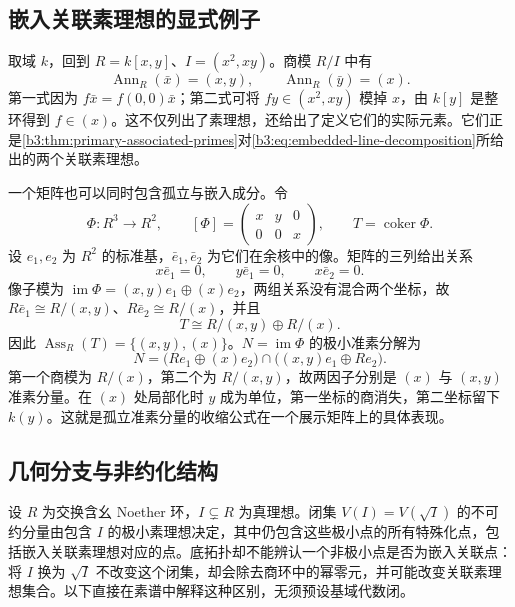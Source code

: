 \subsection{嵌入关联素理想的显式例子}
\label{b3:subsec:0404:02}

取域 \(k\)，回到 \(R=k[x,y]\)、\(I=(x^2,xy)\)。商模 \(R/I\) 中有
\[
	\operatorname{Ann}_R(\bar x)=(x,y),\qquad \operatorname{Ann}_R(\bar y)=(x).
\]
第一式因为 \(f\bar x=f(0,0)\bar x\)；第二式可将 \(fy\in(x^2,xy)\) 模掉 \(x\)，由 \(k[y]\) 是整环得到 \(f\in(x)\)。这不仅列出了素理想，还给出了定义它们的实际元素。它们正是\cref{b3:thm:primary-associated-primes}对\cref{b3:eq:embedded-line-decomposition}所给出的两个关联素理想。

\ProseParagraphBreak
一个矩阵也可以同时包含孤立与嵌入成分。令
\[
	\Phi:R^3\longrightarrow R^2,\qquad
	[\Phi]=\begin{pmatrix}x&y&0\\0&0&x\end{pmatrix},
	\qquad T=\operatorname{coker}\Phi.
\]
设 \(e_1,e_2\) 为 \(R^2\) 的标准基，\(\bar e_1,\bar e_2\) 为它们在余核中的像。矩阵的三列给出关系
\[
	x\bar e_1=0,\qquad y\bar e_1=0,\qquad x\bar e_2=0.
\]
像子模为 \(\operatorname{im}\Phi=(x,y)e_1\oplus(x)e_2\)，两组关系没有混合两个坐标，故 \(R\bar e_1\cong R/(x,y)\)、\(R\bar e_2\cong R/(x)\)，并且
\[
	T\cong R/(x,y)\oplus R/(x).
\]
因此 \(\operatorname{Ass}_R(T)=\bigl\{(x,y),(x)\bigr\}\)。\(N=\operatorname{im}\Phi\) 的极小准素分解为
\[
	N=\bigl(Re_1\oplus(x)e_2\bigr) \cap\bigl((x,y)e_1\oplus Re_2\bigr).
\]
第一个商模为 \(R/(x)\)，第二个为 \(R/(x,y)\)，故两因子分别是 \((x)\) 与 \((x,y)\) 准素分量。在 \((x)\) 处局部化时 \(y\) 成为单位，第一坐标的商消失，第二坐标留下 \(k(y)\)。这就是孤立准素分量的收缩公式在一个展示矩阵上的具体表现。

\subsection{几何分支与非约化结构}
\label{b3:subsec:0404:03}

设 \(R\) 为交换含幺 Noether 环，\(I\subsetneq R\) 为真理想。闭集 \(V(I)=V(\sqrt I)\) 的不可约分量由包含 \(I\) 的极小素理想决定，其中仍包含这些极小点的所有特殊化点，包括嵌入关联素理想对应的点。底拓扑却不能辨认一个非极小点是否为嵌入关联点：将 \(I\) 换为 \(\sqrt I\) 不改变这个闭集，却会除去商环中的幂零元，并可能改变关联素理想集合。以下直接在素谱中解释这种区别，无须预设基域代数闭。

